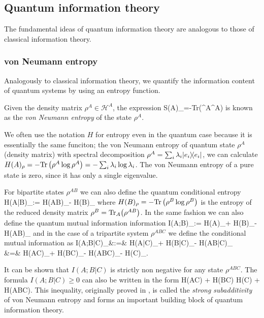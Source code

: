\documentclass[aps,11pt,twoside,letterpaper]{article}
\def\Tr{\textup{Tr}}
\def\cH{\mathcal{H}}
\theoremstyle{plain}
\theoremstyle{definition}
\begin{document}
		
	\subsection{Quantum information theory}
		The fundamental ideas of quantum information theory are analogous to those of classical information theory. 
		\subsubsection{von Neumann entropy}
		
			Analogously to classical information theory, we quantify the information content of quantum systems 
			by using an entropy function.
			
			\begin{definition} 
				Given the density matrix $\rho^A \in \cH^A$, the expression
				\be
					S(A)_\rho=-\Tr\left(\rho^A\log\rho^A\right)
				\ee
				is known as the \emph{von Neumann entropy} of the state $\rho^A$. 
			\end{definition}
		
            We often use the notation $H$ for entropy even in the quantum case because it is essentially
            the same funciton; the von Neumann entropy of quantum state $\rho^A$ (density matrix) 
            with spectral decomposition $\rho^A = \sum_i \lambda_i | e_i \rangle\!\langle e_i |$, we 
			can calculate $H(A)_\rho=-\Tr\left(\rho^A\log\rho^A\right) = - \sum_i \lambda_i \log \lambda_i$.
			The von Neumann entropy of a pure state is zero, since it has only a single eigenvalue.

			
			For bipartite states $\rho^{AB}$ we can also define the quantum conditional entropy
			\be
				H(A|B)_\rho 	:= 		H(AB)_\rho - H(B)_\rho					\label{cond-entrpy} 
			\ee
			where $H(B)_\rho = -\Tr\left(\rho^B\log\rho^B\right)$ is the entropy of the reduced density matrix
			$\rho^B = \Tr_A\!\left( \rho^{AB}\right)$. In the same fashion we can also define the 
			quantum mutual information information
			\be
				I(A;B)_\rho 	:=		H(A)_\rho + H(B)_\rho - H(AB)_\rho 
			\ee
			and in the case of a tripartite system $\rho^{ABC}$ we define the conditional mutual information 
			as 
			\bea
				I(A;B|C)_\rho 	&:=&	H(A|C)_\rho + H(B|C)_\rho - H(AB|C)_\rho \label{cond-mut-info} \\
								&=&		H(AC)_\rho + H(BC)_\rho - H(ABC)_\rho - H(C)_\rho.
			\eea
		    
			\noindent It can be shown that $I(A;B|C)$ is strictly non negative for any state $\rho^{ABC}$.
			The formula $I(A;B|C)\geq 0$ can also be written in the form
			\be	\label{strong-subadditivity}
				H(AC) + H(BC) 	\geq	H(C) + H(ABC).
			\ee
			This inequality, originally proved in \cite{LR73}, is called the \emph{strong subadditivity} of von Neumann 
			entropy and forms an important building block of quantum information theory.
			
\end{document}
